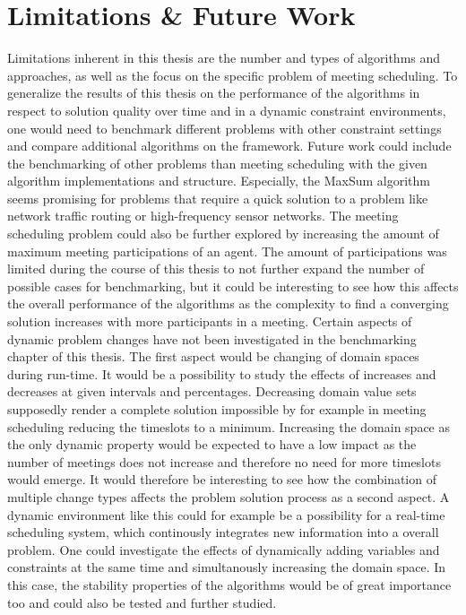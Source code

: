 \chapter{Limitations \& Future Work}
\label{c:limitations}
Limitations inherent in this thesis are the number and types of algorithms and approaches, as well as the focus on the specific problem of meeting scheduling. To generalize the results of this thesis on the performance of the algorithms in respect to solution quality over time and in a dynamic constraint environments, one would need to benchmark different problems with other constraint settings and compare additional algorithms on the framework. 
Future work could include the benchmarking of other problems than meeting scheduling with the given algorithm implementations and structure. Especially, the MaxSum algorithm seems promising for problems that require a quick solution to a problem like network traffic routing or high-frequency sensor networks. The meeting scheduling problem could also be further explored by increasing the amount of maximum meeting participations of an agent. The amount of participations was limited during the course of this thesis to not further expand the number of possible cases for benchmarking, but it could be interesting to see how this affects the overall performance of the algorithms as the complexity to find a converging solution increases with more participants in a meeting.
 \newline \newline
 Certain aspects of dynamic problem changes have not been investigated in the benchmarking chapter of this thesis. The first aspect would be changing of domain spaces during run-time. It would be a possibility to study the effects of  increases and decreases at given intervals and percentages. Decreasing domain value sets supposedly render a complete solution impossible by for example in meeting scheduling reducing the timeslots to a minimum.  Increasing the domain space as the only dynamic property would be expected to have a low impact as the number of meetings does not increase and therefore no need for more timeslots would emerge. It would therefore be interesting to see how the combination of multiple change types affects the problem solution process as a second aspect. A dynamic environment like this could for example be a possibility for a real-time scheduling system, which continously integrates new information into a overall problem. One could investigate the effects of dynamically adding variables and constraints at the same time and simultanously increasing the domain space. In this case, the stability properties of the algorithms would be of great importance too and could also be tested and further studied.
 

 